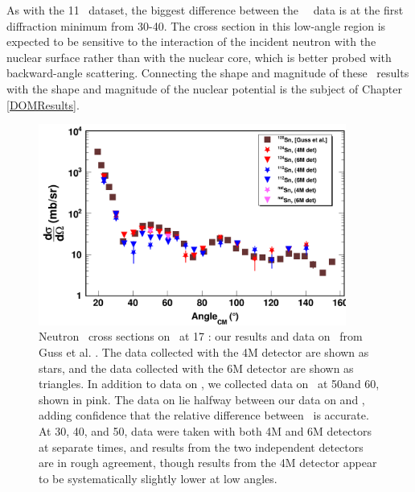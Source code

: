 As with the 11 \mega\electronvolt\ dataset, the biggest difference between the
\snTwelveFour\ \el\ data is at the first diffraction minimum from
30-40\textdegree. The cross section in this low-angle region is expected
to be sensitive to the interaction of the incident neutron
with the nuclear surface rather than with the nuclear core, which
is better probed with backward-angle scattering. Connecting the shape and
magnitude of these \el\ results with the shape and magnitude of the nuclear
potential is the subject of Chapter \ref{DOMResults}.

\begin{figure}[tb]
    \centering
    \includegraphics[width = 0.9\textwidth]{figures/ECSResults2018.png}
    \caption[Neutron \el\ on \snTwelveFour at 17 \mega\electronvolt: our results and
    literature data]
    {
        Neutron \el\ cross sections on \snTwelveFour\ at 17
        \mega\electronvolt: our results and data on \snTwenty\ from Guss et al.
        \cite{Guss1989}. The data collected with the 4M detector
        are shown as stars, and the data collected
        with the 6M detector are shown as triangles. In addition to data on
        \snTwelveFour, we collected data on \snNat\ at 50\textdegree and
        60\textdegree, shown in pink. The data on \snNat lie halfway between our data on
        \snTwelve and \snFour, adding confidence that the relative difference
        between \snTwelveFour\ is accurate. At 30\textdegree,
        40\textdegree, and 50\textdegree, data were taken with both 4M
        and 6M detectors at separate times, and results from the two independent
        detectors are in rough agreement, though results from the 4M detector appear
        to be systematically slightly lower at low angles.
    }
    \label{SnECS_17MeV}
\end{figure}

\afterpage{\clearpage}

